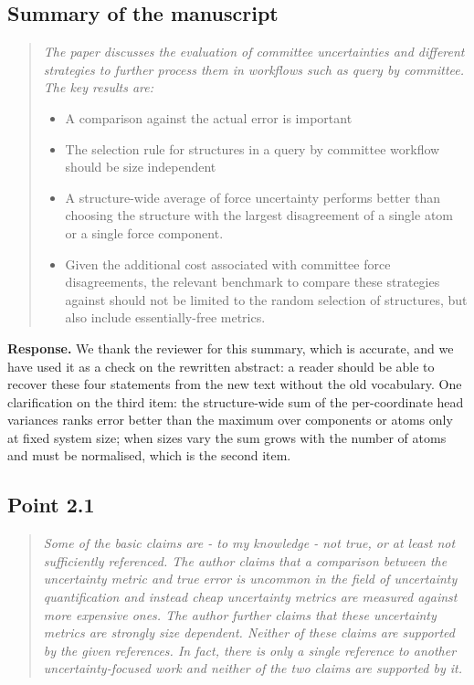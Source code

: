 \documentclass[11pt]{article}
\newcommand{\rpoint}[1]{\begin{quote}\itshape #1\end{quote}}
\newcommand{\response}{\medskip\noindent\textbf{Response.} }
\begin{document}
\subsection*{Summary of the manuscript}
\rpoint{The paper discusses the evaluation of committee uncertainties and
different strategies to further process them in workflows such as query by
committee. The key results are:
\begin{itemize}
\item A comparison against the actual error is important
\item The selection rule for structures in a query by committee workflow
  should be size independent
\item A structure-wide average of force uncertainty performs better than
  choosing the structure with the largest disagreement of a single atom or a
  single force component.
\item Given the additional cost associated with committee force
  disagreements, the relevant benchmark to compare these strategies against
  should not be limited to the random selection of structures, but also
  include essentially-free metrics.
\end{itemize}}

\response
We thank the reviewer for this summary, which is accurate, and we have used
it as a check on the rewritten abstract: a reader should be able to recover
these four statements from the new text without the old vocabulary. One
clarification on the third item: the structure-wide sum of the per-coordinate
head variances ranks error better than the maximum over components or atoms
only at fixed system size; when sizes vary the sum grows with the number of
atoms and must be normalised, which is the second item.

\subsection*{Point 2.1}
\rpoint{Some of the basic claims are - to my knowledge - not true, or at
least not sufficiently referenced. The author claims that a comparison
between the uncertainty metric and true error is uncommon in the field of
uncertainty quantification and instead cheap uncertainty metrics are measured
against more expensive ones. The author further claims that these uncertainty
metrics are strongly size dependent. Neither of these claims are supported by
the given references. In fact, there is only a single reference to another
uncertainty-focused work and neither of the two claims are supported by it.}
\end{document}

